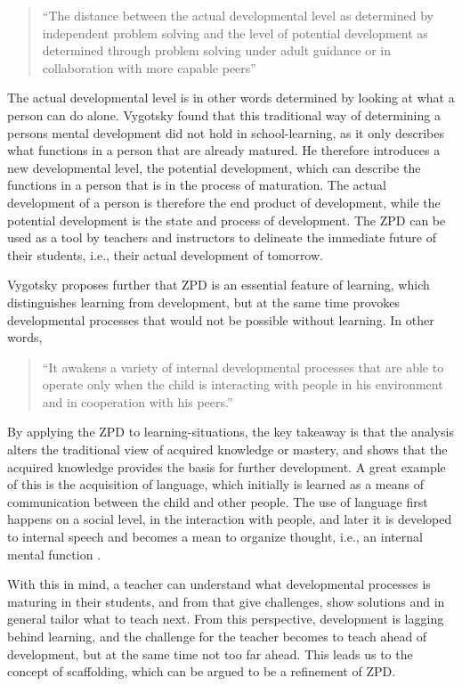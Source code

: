 \begin{quote}“The distance between the actual developmental level as determined by independent problem solving and the level of potential development as determined through problem solving under adult guidance or in collaboration with more capable peers” \citep[p. 86]{vygotskiui1978mind}
\end{quote}

The actual developmental level is in other words determined by looking at what a person can do alone. Vygotsky found that this traditional way of determining a persons mental development did not hold in school-learning, as it only describes what functions in a person that are already matured. He therefore introduces a new developmental level, the potential development, which can describe the functions in a person that is in the process of maturation. The actual development of a person is therefore the end product of development, while the potential development is the state and process of development. The ZPD can be used as a tool by teachers and instructors to delineate the immediate future of their students, i.e., their actual development of tomorrow.

Vygotsky proposes further that ZPD is an essential feature of learning, which distinguishes learning from development, but at the same time provokes developmental processes that would not be possible without learning. In other words,

\begin{quote}“It awakens a variety of internal developmental processes that are able to operate only when the child is interacting with people  in  his  environment  and  in  cooperation  with his peers.” \citep[p. 90]{vygotskiui1978mind}
\end{quote}

By applying the ZPD to learning-situations, the key takeaway is that the analysis alters the traditional view of acquired knowledge or mastery, and shows that the acquired knowledge provides the basis for further development. A great example of this is the acquisition of language, which initially is learned as a means of communication between the child and other people. The use of language first happens on a social level, in the interaction with people, and later it is developed to internal speech and becomes a mean to organize thought, i.e., an internal mental function \citep[p. 89]{vygotskiui1978mind}.

With this in mind, a teacher can understand what developmental processes is maturing in their students, and from that give challenges, show solutions and in general tailor what to teach next. From this perspective, development is lagging behind learning, and the challenge for the teacher becomes to teach ahead of development, but at the same time not too far ahead. This leads us to the concept of scaffolding, which can be argued to be a refinement of ZPD.

